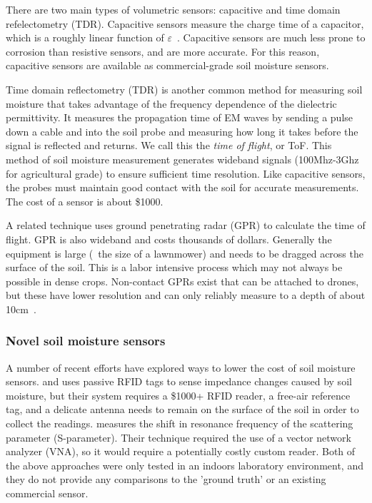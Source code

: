 \documentclass[12pt]{article}
\begin{document}
There are two main types of volumetric sensors: capacitive and time
domain refelectometry (TDR). Capacitive sensors measure the charge
time of a capacitor, which is a roughly linear function of
$\varepsilon$~\cite{sensorOverview}. Capacitive sensors are much less
prone to corrosion than resistive sensors, and are more accurate. For
this reason, capacitive sensors are available as commercial-grade soil
moisture sensors. 

Time domain reflectometry (TDR) is another common method for measuring
soil moisture that takes advantage of the frequency dependence of the
dielectric permittivity. It measures the propagation time of EM waves
by sending a pulse down a cable and into the soil probe and measuring
how long it takes before the signal is reflected and returns. We call
this the \emph{time of flight}, or ToF. This method of soil moisture
measurement generates wideband signals (100Mhz-3Ghz for agricultural
grade) to ensure sufficient time resolution. Like capacitive sensors,
the probes must maintain good contact with the soil for accurate
measurements. The cost of a sensor is about \$1000.

A related technique uses ground penetrating radar (GPR) to calculate
the time of flight. GPR is also wideband and costs thousands of
dollars. Generally the equipment is large (~the size of a lawnmower)
and needs to be dragged across the surface of the soil. This is a
labor intensive process which may not always be possible in dense
crops. Non-contact GPRs exist that can be attached to drones, but
these have lower resolution and can only reliably measure to a depth
of about 10cm~\cite{gpr}.

\subsubsection*{Novel soil moisture sensors}
A number of recent efforts have explored ways to lower the cost of
soil moisture sensors. \cite{Hasan2013} and uses passive RFID tags to sense
impedance changes caused by soil moisture, but their system requires a
\$1000+ RFID reader, a free-air reference tag, and a delicate antenna
needs to remain on the surface of the soil in order to collect the
readings. \cite{Dey2016} measures the shift in resonance frequency of the
scattering parameter (S-parameter). Their technique required the use
of a vector network analyzer (VNA), so it would require a potentially
costly custom reader. Both of the above approaches were only tested in
an indoors laboratory environment, and they do not provide any
comparisons to the 'ground truth' or an existing commercial sensor.
\end{document}
